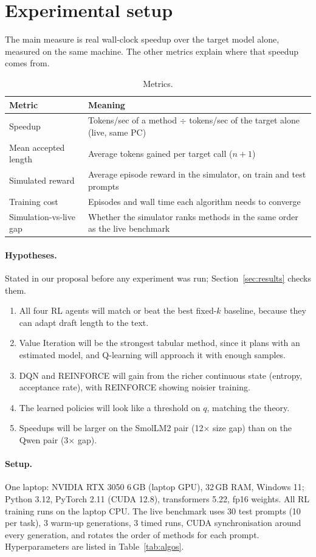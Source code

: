 \section{Experimental setup}

The main measure is real wall-clock speedup over the target model alone, measured on the same machine. The other metrics explain where that speedup comes from.

\begin{table}[h]
\centering
\caption{Metrics.}
\label{tab:metrics}
\begin{tabularx}{\linewidth}{@{}lX@{}}
\toprule
Metric & Meaning \\
\midrule
Speedup & Tokens/sec of a method $\div$ tokens/sec of the target alone (live, same PC) \\
Mean accepted length & Average tokens gained per target call ($n+1$) \\
Simulated reward & Average episode reward in the simulator, on train and test prompts \\
Training cost & Episodes and wall time each algorithm needs to converge \\
Simulation-vs-live gap & Whether the simulator ranks methods in the same order as the live benchmark \\
\bottomrule
\end{tabularx}
\end{table}

\paragraph{Hypotheses.} Stated in our proposal before any experiment was run; Section~\ref{sec:results} checks them.
\begin{enumerate}
  \item All four RL agents will match or beat the best fixed-$k$ baseline, because they can adapt draft length to the text.
  \item Value Iteration will be the strongest tabular method, since it plans with an estimated model, and Q-learning will approach it with enough samples.
  \item DQN and REINFORCE will gain from the richer continuous state (entropy, acceptance rate), with REINFORCE showing noisier training.
  \item The learned policies will look like a threshold on $q$, matching the theory.
  \item Speedups will be larger on the SmolLM2 pair (12$\times$ size gap) than on the Qwen pair (3$\times$ gap).
\end{enumerate}

\paragraph{Setup.} One laptop: NVIDIA RTX 3050 6\,GB (laptop GPU), 32\,GB RAM, Windows 11; Python 3.12, PyTorch 2.11 (CUDA 12.8), transformers 5.22, fp16 weights. All RL training runs on the laptop CPU. The live benchmark uses 30 test prompts (10 per task), 3 warm-up generations, 3 timed runs, CUDA synchronisation around every generation, and rotates the order of methods for each prompt. Hyperparameters are listed in Table~\ref{tab:algos}.
